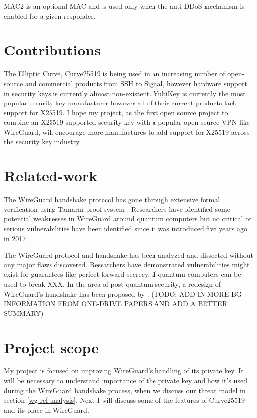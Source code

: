 \documentclass [11pt, proquest] {uwthesis}[2020/02/24]
\begin{document}
MAC2 is an optional MAC and is used only when the anti-DDoS mechanism is enabled for a given responder. 


\section {Contributions}
The Elliptic Curve, Curve25519 is being used in an increasing number of open-source and commercial products\cite{noauthor_things_nodate-1} from SSH to Signal, however hardware support in 
security keys is currently almost non-existent. YubiKey is currently the most popular security key manufacturer however all of their current products 
lack support for X25519. I hope my project, as the first open source project to combine an X25519 supported security key with a popular open source VPN like WireGuard, will encourage more manufactures to add support for X25519 across the security key industry.

\section {Related-work}
The WireGuard handshake protocol has gone through extensive formal verification using Tamarin proof system \cite{donenfeld_formal_2018}. Researchers have identified some potential weaknesses in WireGuard around quantum computers but no critical or serious vulnerabilities have been identified since it was introduced five years ago in 2017.

The WireGuard protocol and handshake has been analyzed and dissected without any major flaws discovered. Researchers have demonstrated vulnerabilities might exist for guarantees like perfect-forward-secrecy, if quantum computers can be used to break XXX.  In the area of post-quantum security, a redesign of WireGuard's handshake has been proposed by \cite{hulsing_post-quantum_2021}.
(TODO: ADD IN MORE BG INFORMATION FROM ONE-DRIVE PAPERS AND ADD A BETTER SUMMARY)

\section {Project scope}

My project is focused on improving WireGuard's handling of its private key.
It will be necessary to understand importance of the private key and how it's used during the WireGuard handshake process, when we discuss our threat model in section \ref{wg-ref-analysis}. Next I will discuss some of the features of Curve25519 and its place in WireGuard.
\end{document}
